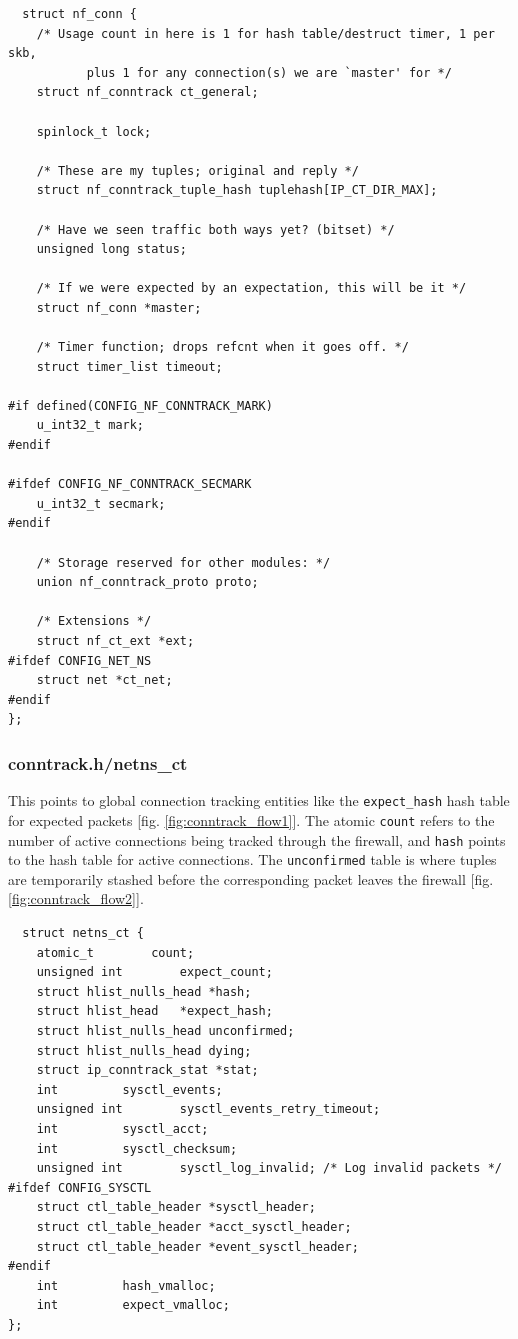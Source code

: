 \documentclass[a4paper,10pt]{article}
\newcommand{\figref}[1]{[fig. \ref{#1}]}
\begin{document}
\begin{lstlisting}
  struct nf_conn {
	/* Usage count in here is 1 for hash table/destruct timer, 1 per skb,
           plus 1 for any connection(s) we are `master' for */
	struct nf_conntrack ct_general;

	spinlock_t lock;

	/* These are my tuples; original and reply */
	struct nf_conntrack_tuple_hash tuplehash[IP_CT_DIR_MAX];

	/* Have we seen traffic both ways yet? (bitset) */
	unsigned long status;

	/* If we were expected by an expectation, this will be it */
	struct nf_conn *master;

	/* Timer function; drops refcnt when it goes off. */
	struct timer_list timeout;

#if defined(CONFIG_NF_CONNTRACK_MARK)
	u_int32_t mark;
#endif

#ifdef CONFIG_NF_CONNTRACK_SECMARK
	u_int32_t secmark;
#endif

	/* Storage reserved for other modules: */
	union nf_conntrack_proto proto;

	/* Extensions */
	struct nf_ct_ext *ext;
#ifdef CONFIG_NET_NS
	struct net *ct_net;
#endif
};
\end{lstlisting}

\subsubsection{conntrack.h/netns\_ct}

This points to global connection tracking entities like the
\verb|expect_hash| hash table for expected packets \figref{fig:conntrack_flow1}. The atomic
\verb|count| refers to the number of active connections being tracked
through the firewall, and \verb|hash| points to the hash table for
active connections. The \verb|unconfirmed| table is where tuples are
temporarily stashed before the corresponding packet leaves the
firewall \figref{fig:conntrack_flow2}.

\begin{lstlisting}
  struct netns_ct {
	atomic_t		count;
	unsigned int		expect_count;
	struct hlist_nulls_head	*hash;
	struct hlist_head	*expect_hash;
	struct hlist_nulls_head	unconfirmed;
	struct hlist_nulls_head	dying;
	struct ip_conntrack_stat *stat;
	int			sysctl_events;
	unsigned int		sysctl_events_retry_timeout;
	int			sysctl_acct;
	int			sysctl_checksum;
	unsigned int		sysctl_log_invalid; /* Log invalid packets */
#ifdef CONFIG_SYSCTL
	struct ctl_table_header	*sysctl_header;
	struct ctl_table_header	*acct_sysctl_header;
	struct ctl_table_header	*event_sysctl_header;
#endif
	int			hash_vmalloc;
	int			expect_vmalloc;
};
\end{lstlisting}
\end{document}
